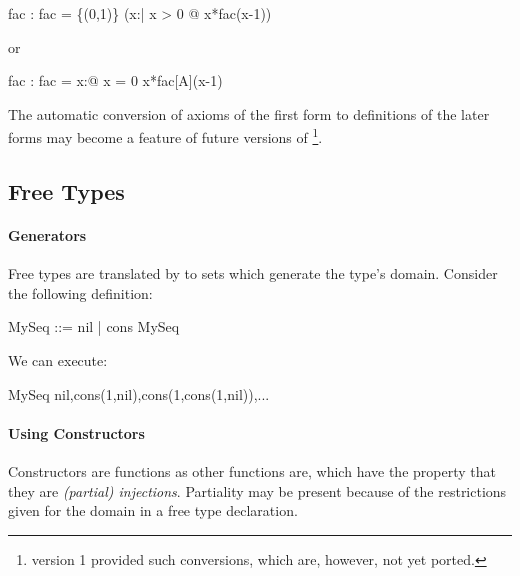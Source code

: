 \documentclass{article}
\begin{document}

\begin{axdef}
  fac : \nat \fun \nat
\where
  fac = \{(0,1)\} \cup (\lambda x:\nat | x > 0 @ x*fac(x-1))
\end{axdef}

or


\begin{axdef}
  fac : \nat \fun \nat
\where
  fac = \lambda x:\nat @ \IF x = 0  \ELSE x*fac[A](x-1)
\end{axdef}

The automatic conversion of axioms of the first form
to definitions of the later forms may become a feature of future
versions of \ZAP\footnote{\ZAP{} version 1 provided such
conversions, which are, however, not yet ported.}.

\subsection{Free Types}
\label{sec:freetypes}

\paragraph{Generators}

Free types are translated by \ZAP{} to sets which generate the type's
domain.  Consider the following definition:

\begin{zedgroup}
\begin{zdirectives}
\end{zdirectives}
\begin{zed}
  MySeq ::= nil | cons   \cross MySeq \rdata
\end{zed}
\end{zedgroup}

We can execute:

\begin{zexecexpr}
  MySeq
\yields
{nil,cons(1,nil),cons(1,cons(1,nil)),...}
\end{zexecexpr}


\paragraph{Using Constructors}

Constructors are functions as other functions are, which have
the property that they are \emph{(partial) injections}. Partiality
may be present because of the restrictions given for the domain 
in a free type declaration. 
\end{document}
